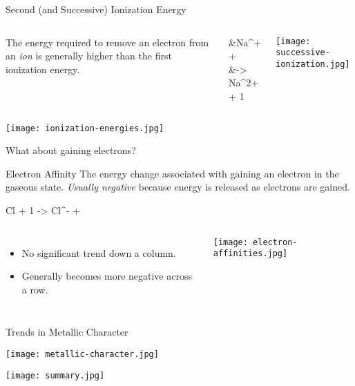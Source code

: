 \documentclass[notes=hide]{beamer}
\begin{document}
\begin{frame}[allowframebreaks]{Second (and Successive) Ionization Energy}
	\begin{columns}
		The energy required to remove an electron from an \emph{ion} is
		generally higher than the first ionization energy.
		
		\begin{reactions*}
			&Na^{+}\gas{} +  \\
			&\qquad -> Na^{2+}\gas{} + 1 \el
		\end{reactions*}
		\begin{center}
			\texttt{[image: successive-ionization.jpg]}
		\end{center}
	\end{columns}

	\framebreak

	\begin{center}
		\texttt{[image: ionization-energies.jpg]}
	\end{center}
\end{frame}

\begin{frame}{What about gaining electrons?}
	\begin{block}{Electron Affinity}
		The energy change associated with gaining an electron in the
		gaseous state. \emph{Usually negative} because energy is
		released as electrons are gained.
	\end{block}

	\begin{reaction*}
		Cl\gas{} + 1 \el{} -> Cl^{-}\gas{} + \text{energy}
	\end{reaction*}

	\begin{columns}
		\column{0.45\linewidth}
		\begin{itemize}
			\item No significant trend down a column.
			\item Generally becomes more negative across a row.
		\end{itemize}
		\column{0.45\linewidth}
		\begin{center}
			\texttt{[image: electron-affinities.jpg]}
		\end{center}
	\end{columns}
\end{frame}

\begin{frame}{Trends in Metallic Character}
	\begin{center}
		\texttt{[image: metallic-character.jpg]}
	\end{center}
\end{frame}

\begin{frame}
	\begin{center}
		\texttt{[image: summary.jpg]}
	\end{center}
\end{frame}
\end{document}
